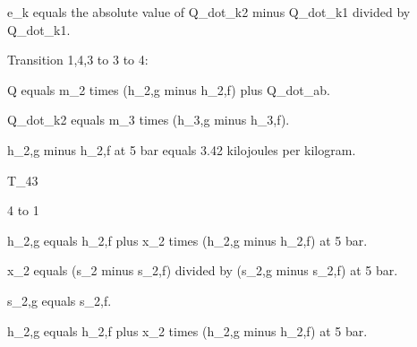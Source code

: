 e_k equals the absolute value of Q_dot_k2 minus Q_dot_k1 divided by Q_dot_k1.

Transition 1,4,3 to 3 to 4:

Q equals m_2 times (h_2,g minus h_2,f) plus Q_dot_ab.

Q_dot_k2 equals m_3 times (h_3,g minus h_3,f).

h_2,g minus h_2,f at 5 bar equals 3.42 kilojoules per kilogram.

T_43

4 to 1

h_2,g equals h_2,f plus x_2 times (h_2,g minus h_2,f) at 5 bar.

x_2 equals (s_2 minus s_2,f) divided by (s_2,g minus s_2,f) at 5 bar.

s_2,g equals s_2,f.

h_2,g equals h_2,f plus x_2 times (h_2,g minus h_2,f) at 5 bar.